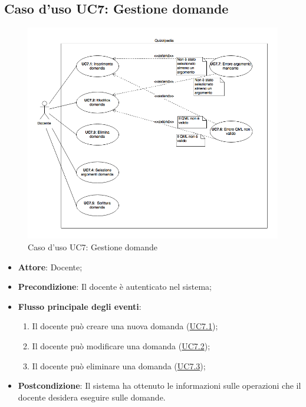 \documentclass[12pt,a4paper]{article}
\begin{document}
\subsection{Caso d'uso UC7: Gestione domande}
\begin{figure}[H]
	\centering
	\includegraphics[width=\textwidth]{diagramUC7.png}
	\caption{Caso d'uso UC7: Gestione domande}\label{fig:UC7} 
\end{figure}
\begin{itemize}

\item \textbf{Attore}: Docente; 
\item \textbf{Precondizione}: Il docente è autenticato nel sistema;

\item \textbf{Flusso principale degli eventi}:
\begin{enumerate}
	\item Il docente può creare una nuova domanda (\hyperlink{UC7.1}{UC7.1});
	\item Il docente può modificare una domanda (\hyperlink{UC7.2}{UC7.2});
	\item Il docente può eliminare una domanda (\hyperlink{UC7.3}{UC7.3});
	
\end{enumerate}
\item \textbf{Postcondizione}: Il sistema ha ottenuto le informazioni sulle operazioni che il docente desidera eseguire sulle domande.
\end{itemize}
\hypertarget{UC7.1}{}
\end{document}
